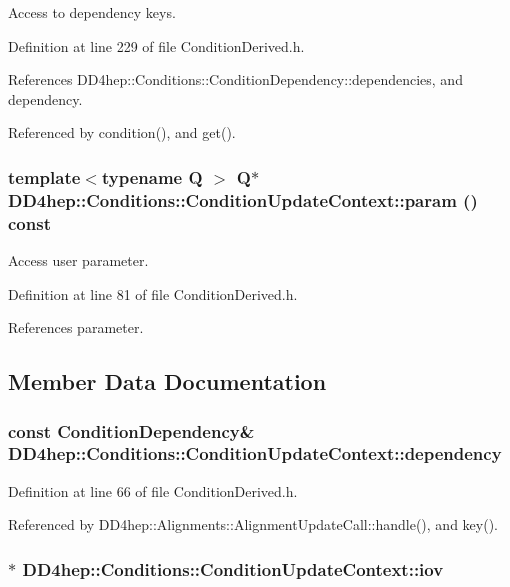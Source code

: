 Access to dependency keys. 

Definition at line 229 of file ConditionDerived.h.

References DD4hep::Conditions::ConditionDependency::dependencies, and dependency.

Referenced by condition(), and get().\hypertarget{class_d_d4hep_1_1_conditions_1_1_condition_update_context_a64bd2c39aa3e4d989d2cd0898606e8a7}{
\subsubsection[{param}]{\setlength{\rightskip}{0pt plus 5cm}template$<$typename Q $>$ Q$\ast$ DD4hep::Conditions::ConditionUpdateContext::param () const}}
\label{class_d_d4hep_1_1_conditions_1_1_condition_update_context_a64bd2c39aa3e4d989d2cd0898606e8a7}


Access user parameter. 

Definition at line 81 of file ConditionDerived.h.

References parameter.

\subsection{Member Data Documentation}
\hypertarget{class_d_d4hep_1_1_conditions_1_1_condition_update_context_aaea028db7dc9ed95d2a5f34a4a2a3efd}{
\subsubsection[{dependency}]{\setlength{\rightskip}{0pt plus 5cm}const {\bf ConditionDependency}\& {\bf DD4hep::Conditions::ConditionUpdateContext::dependency}}}
\label{class_d_d4hep_1_1_conditions_1_1_condition_update_context_aaea028db7dc9ed95d2a5f34a4a2a3efd}


Definition at line 66 of file ConditionDerived.h.

Referenced by DD4hep::Alignments::AlignmentUpdateCall::handle(), and key().\hypertarget{class_d_d4hep_1_1_conditions_1_1_condition_update_context_acdeb1015159a6df55df3c3e614651d4e}{
\subsubsection[{iov}]{$\ast$ {\bf DD4hep::Conditions::ConditionUpdateContext::iov}}}
\label{class_d_d4hep_1_1_conditions_1_1_condition_update_context_acdeb1015159a6df55df3c3e614651d4e}


